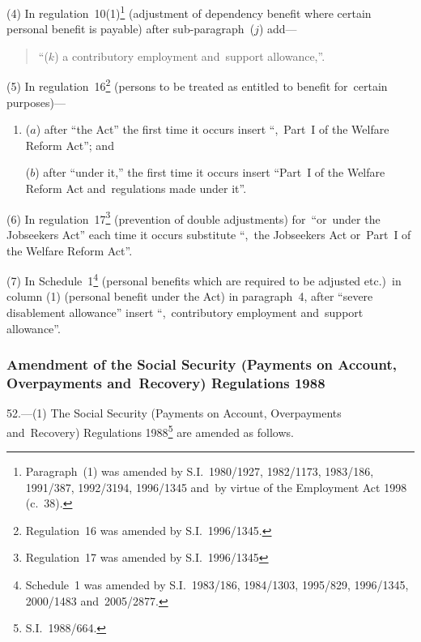 \documentclass[12pt,a4paper]{article}
\begin{document}
(4) In regulation~10(1)\footnote{Paragraph~(1) was amended by S.I.~1980/1927, 1982/1173, 1983/186, 1991/387, 1992/3194, 1996/1345 and~by virtue of the Employment Act 1998 (c.~38).} (adjustment of dependency benefit where certain personal benefit is payable) after sub-paragraph~($j$)  add—
\begin{quotation}
“($k$) a contributory employment and~support allowance,”.
\end{quotation}

(5) In regulation~16\footnote{Regulation~16 was amended by S.I.~1996/1345.} (persons to be treated as entitled to benefit for~certain purposes)—
\begin{enumerate}\item[]
($a$) after “the Act” the first time it occurs insert “,~Part~I of the Welfare Reform Act”; and

($b$) after “under it,” the first time it occurs insert “Part~I of the Welfare Reform Act and~regulations made under it”.
\end{enumerate}

(6) In regulation~17\footnote{Regulation~17 was amended by S.I.~1996/1345} (prevention of double adjustments) for~“or~under the Jobseekers Act” each time it occurs substitute “,~the Jobseekers Act or~Part~I of the Welfare Reform Act”.

(7) In Schedule~1\footnote{Schedule~1 was amended by S.I.~1983/186, 1984/1303, 1995/829, 1996/1345, 2000/1483 and~2005/2877.} (personal benefits which are required to be adjusted etc.)\ in column (1) (personal benefit under the Act) in paragraph~4, after “severe disablement allowance” insert “,~contributory employment and~support allowance”.

\subsubsection[52. Amendment of the Social Security (Payments on Account, Overpayments and~Recovery) Regulations 1988]{Amendment of the Social Security (Payments on Account, Overpayments and~Recovery) Regulations 1988}

52.---(1)  The Social Security (Payments on Account, Overpayments and~Recovery) Regulations 1988\footnote{S.I.~1988/664.} are amended as follows.
\end{document}
